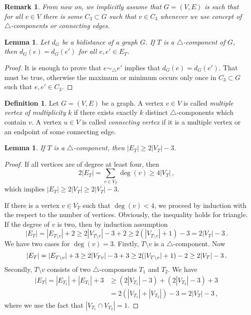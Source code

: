 \documentclass[a4paper, 11pt]{article}
\newcommand{\trcomp}{$\triangle$-component}
\newcommand{\trcomps}{$\triangle$-components}
\newtheorem{lem}[thm]{Lemma}
\newtheorem*{rem}{Remark}
\theoremstyle{definition}
\newtheorem{defn}{Definition}[section]
\begin{document}
\begin{rem}
From now on, we implicitly assume that $G=(V,E)$ is such that for all $v\in V$ there is some $C_3\subset G$ such that $v\in C_3$ whenever we use concept of \trcomps{} or connecting edges.
\end{rem}

\begin{lem}
\label{lem:bidistanceInTrcomp}
Let $d_G$ be a bidistance of a graph $G$. If $T$ is a \trcomp{} of $G$, then $d_G(e)=d_G(e')$ for all $e,e'\in E_T$.
\end{lem}
\begin{proof}
It is enough to prove that $e \sim_{\!\!\bigtriangleup} e'$ implies that $d_G(e)=d_G(e')$. That must be true, otherwise the maximum or minimum occurs only once in $C_3\subset G$ such that $e,e'\in C_3$.
\end{proof}





\begin{defn}
Let $G=(V,E)$ be a graph. A vertex $v\in V$ is called \emph{multiple vertex of multiplicity} $k$ if there exists exactly $k$ distinct \trcomps{} which contain $v$. A vertex $u\in V$ is called \emph{connecting vertex} if it is a multiple vertex or an endpoint of some connecting edge.
\end{defn}

\begin{lem}
If $T$ is a \trcomp{}, then $|E_T|\geq 2|V_T|-3$.
\label{lem:sizeTriangleComponent}
\end{lem}
\begin{proof}
If all vertices are of degree at least four, then $$2|E_T|=\sum_{v\in V_T} \deg(v) \geq 4|V_T|\,,$$ which implies $|E_T|\geq 2|V_T|\geq 2|V_T|-3$.

If there is a vertex $v\in V_T$ such that $\deg(v)<4$, we proceed by induction with the respect to the number of vertices. Obviously, the inequality holds for triangle. If the degree of $v$ is two, then by induction assumption
$$
|E_T|=|E_{T\setminus v}|+2\geq 2 |V_{T\setminus v}|-3 +2\geq 2 (|V_{T\setminus v}|+1)-3=2 |V_{T}|-3\,.
$$
We have two cases for $\deg(v)=3$. Firstly, $T\setminus v$ is a \trcomp{}. Now $$|E_T|=|E_{T\setminus v}|+3\geq 2 |V_{T\\v}|-3 +3\geq 2 (|V_{T\setminus v}|+1)-2\geq 2 |V_{T}|-3\,.$$ Secondly, $T\setminus v$ consists of two \trcomps{} $T_1$ and $T_2$. We have
\begin{align*}
|E_T|=|E_{T_1}|+|E_{T_1}|+3 &\geq (2 |V_{T_1}|-3)+(2 |V_{T_2}|-3) +3 \\
			&= 2(|V_{T_1}| +|V_{T_2}|)-3=2 |V_{T}|-3\,,
\end{align*}
where we use the fact that $|V_{T_1} \cap V_{T_2}|=1$.
\end{proof}
\end{document}
